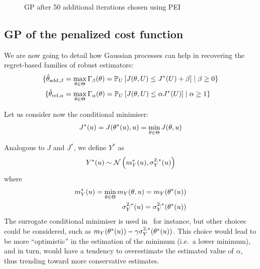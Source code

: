 \documentclass[../../Main_ManuscritThese.tex]{subfiles}
\newcommand\imgpath{/home/victor/acadwriting/Manuscrit/Text/Chapter4/img/}
\begin{document}
\begin{figure}[ht]
  \centering
  
  \caption{\label{fig:example_PEI} GP after 50 additional iterations chosen using PEI }
\end{figure}




\subsection{GP of the penalized cost function}
\label{ssec:gp_delta_alpha}

We are now going to detail how Gaussian processes can help in recovering the regret-based families of robust estimators:
\begin{align}
  \{ \hat{\theta}_{\mathrm{add,\beta}} &= \max_{\theta\in\Theta} \Gamma_\beta(\theta) = \mathbb{P}_{U}\left[J(\theta, U) \leq J^*(U) + \beta \right] \mid \beta \geq 0 \} \\
\{ \hat{\theta}_{\mathrm{rel,\alpha}} &= \max_{\theta\in\Theta} \Gamma_\alpha(\theta) = \mathbb{P}_{U}\left[J(\theta, U) \leq \alpha J^*(U)\right] \mid \alpha \geq 1 \}
\end{align}

Let us consider now the conditional minimiser:
\begin{align}
  J^*(u) = J(\theta^*(u),u) = \min_{\theta\in\Theta} J(\theta,u)
\end{align}

Analogous to $J$ and $J^*$, we define $Y^*$ as
\begin{equation}
  Y^*(u) \sim \mathcal{N}\left(m^*_Y(u), \sigma^{2,*}_Y(u)\right)
\end{equation}
where
\begin{align}
  m^*_Y(u) = \min_{\theta\in\Theta} m_Y(\theta,u) = m_Y(\theta^*(u)) \\
  \sigma^{2,*}_Y(u) = \sigma^{2,*}_Y(\theta^*(u)) 
\end{align}
The surrogate conditional minimiser is used in~\cite{ginsbourger_bayesian_2014} for instance, but other choices could be considered, such as $m_Y(\theta^*(u)) - \gamma \sigma^{2,*}_Y(\theta^*(u))$. This choice would lead to be more ``optimistic'' in the estimation of the minimum (i.e.\ a lower minimum), and in turn, would have a tendency to overestimate the estimated value of $\alpha$, thus trending toward more conservative estimates.
\end{document}
